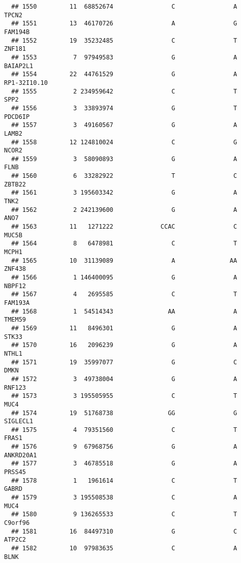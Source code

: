 \documentclass[12pt,twoside]{reedthesis}
\theoremstyle{definition}
\theoremstyle{definition}
\theoremstyle{remark}
\begin{document}
\begin{verbatim}
  ## 1550         11  68852674                C                A          TPCN2
  ## 1551         13  46170726                A                G        FAM194B
  ## 1552         19  35232485                C                T         ZNF181
  ## 1553          7  97949583                G                A       BAIAP2L1
  ## 1554         22  44761529                G                A   RP1-32I10.10
  ## 1555          2 234959642                C                T           SPP2
  ## 1556          3  33893974                G                T        PDCD6IP
  ## 1557          3  49160567                G                A          LAMB2
  ## 1558         12 124810024                C                G          NCOR2
  ## 1559          3  58090893                G                A           FLNB
  ## 1560          6  33282922                T                C         ZBTB22
  ## 1561          3 195603342                G                A           TNK2
  ## 1562          2 242139600                G                A           ANO7
  ## 1563         11   1271222             CCAC                C          MUC5B
  ## 1564          8   6478981                C                T          MCPH1
  ## 1565         10  31139089                A               AA         ZNF438
  ## 1566          1 146400095                G                A         NBPF12
  ## 1567          4   2695585                C                T        FAM193A
  ## 1568          1  54514343               AA                A         TMEM59
  ## 1569         11   8496301                G                A          STK33
  ## 1570         16   2096239                G                A          NTHL1
  ## 1571         19  35997077                G                C           DMKN
  ## 1572          3  49738004                G                A         RNF123
  ## 1573          3 195505955                C                T           MUC4
  ## 1574         19  51768738               GG                G       SIGLECL1
  ## 1575          4  79351560                C                T          FRAS1
  ## 1576          9  67968756                G                A      ANKRD20A1
  ## 1577          3  46785518                G                A         PRSS45
  ## 1578          1   1961614                C                T          GABRD
  ## 1579          3 195508538                C                A           MUC4
  ## 1580          9 136265533                C                T        C9orf96
  ## 1581         16  84497310                G                C         ATP2C2
  ## 1582         10  97983635                C                A           BLNK

\end{verbatim}
\end{document}
